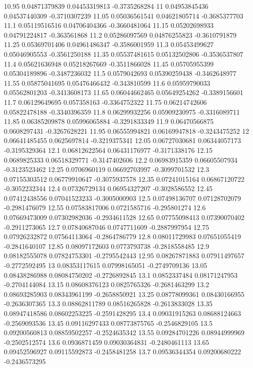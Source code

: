 {10.95 0.04871379839 0.04453319813 -0.3735268284
11 0.04953845436 0.04537440309 -0.3710307239
11.05 0.05036561541 0.04621805714 -0.3685377703
11.1 0.05119516516 0.04706404366 -0.3660481064
11.15 0.05202698933 0.04791224817 -0.363561868
11.2 0.05286097569 0.04876255823 -0.3610791879
11.25 0.05369701406 0.04961486347 -0.3586001959
11.3 0.05453499627 0.05046905553 -0.3561250188
11.35 0.05537481615 0.05132502806 -0.3536537807
11.4 0.05621636948 0.05218267669 -0.3511866028
11.45 0.05705955399 0.05304189896 -0.3487236032
11.5 0.0579042693 0.05390259438 -0.3462648977
11.55 0.05875041695 0.05476466432 -0.343810599
11.6 0.05959790033 0.05562801203 -0.3413608173
11.65 0.06044662465 0.05649254262 -0.3389156601
11.7 0.06129649695 0.057358163 -0.3364752322
11.75 0.06214742606 0.05822478188 -0.3340396359
11.8 0.06299932256 0.05909230975 -0.3316089711
11.85 0.06385209878 0.05996065884 -0.3291833349
11.9 0.06470566875 0.0608297431 -0.3267628221
11.95 0.06555994821 0.06169947818 -0.3243475252
12 0.06641485455 0.0625697814 -0.3219375341
12.05 0.06727030681 0.06344057173 -0.3195329364
12.1 0.06812622564 0.06431176977 -0.3171338176
12.15 0.0689825333 0.06518329771 -0.3147402606
12.2 0.06983915359 0.06605507934 -0.3123523462
12.25 0.0706960119 0.06692703997 -0.3099701532
12.3 0.07155303512 0.06779910647 -0.3075937578
12.35 0.07241015164 0.06867120722 -0.3052232344
12.4 0.07326729134 0.06954327207 -0.3028586552
12.45 0.07412438556 0.07041523233 -0.3005000903
12.5 0.07498136707 0.07128702079 -0.2981476079
12.55 0.07583817006 0.0721585716 -0.295801274
12.6 0.07669473009 0.07302982036 -0.2934611528
12.65 0.07755098413 0.07390070402 -0.2911273065
12.7 0.07840687046 0.0747711609 -0.2887997954
12.75 0.07926232872 0.07564113064 -0.2864786779
12.8 0.08011729983 0.07651055419 -0.2841640107
12.85 0.08097172603 0.0773793738 -0.2818558485
12.9 0.08182555078 0.07824753301 -0.2795542443
12.95 0.08267871883 0.07911497657 -0.2772592495
13 0.08353117615 0.07998165051 -0.2749709136
13.05 0.08438286988 0.08084750202 -0.2726892845
13.1 0.0852337484 0.08171247953 -0.2704144084
13.15 0.08608376123 0.0825765326 -0.2681463299
13.2 0.08693285903 0.08343961199 -0.2658850921
13.25 0.08778099361 0.08430166955 -0.2636307365
13.3 0.08862811789 0.08516265828 -0.2613833028
13.35 0.08947418586 0.08602253225 -0.2591428295
13.4 0.09031915263 0.08688124663 -0.2569093536
13.45 0.09116297433 0.08773875765 -0.2546829105
13.5 0.09200560813 0.08859502257 -0.2524635342
13.55 0.09284701226 0.08944999969 -0.2502512574
13.6 0.0936871459 0.09030364831 -0.2480461113
13.65 0.09452596927 0.09115592873 -0.2458481258
13.7 0.09536344354 0.09200680222 -0.2436573295
}
